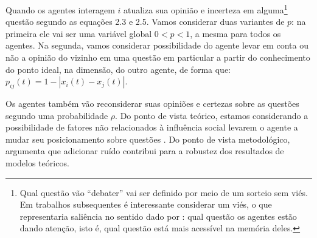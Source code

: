 Quando os agentes interagem \(i\) atualiza sua opinião e incerteza em
alguma\footnote{Qual questão vão ``debater'' vai ser definido por meio de um
  sorteio sem viés. Em trabalhos subsequentes é interessante considerar um viés,
  o que representaria saliência no sentido dado por
  : qual questão os agentes estão dando atenção,
  isto é, qual questão está mais acessível na memória deles.} questão segundo as
equações 2.3 e 2.5. Vamos considerar duas variantes de \(p\): na primeira ele
vai ser uma variável global \(0 < p < 1 \), a mesma para todos os agentes. Na
segunda, vamos considerar possibilidade do agente levar em conta ou não a
opinião do vizinho em uma questão em particular a partir do conhecimento do
ponto ideal, na dimensão, do outro agente, de forma que: \(p_{ij}(t) = 1 -
|x_i(t) - x_j(t)|\).

Os agentes também vão reconsiderar suas opiniões e certezas sobre as questões
segundo uma probabilidade \(\rho\). Do ponto de vista teórico, estamos considerando
a possibilidade de fatores não relacionados à influência social levarem o agente
a mudar seu posicionamento sobre questões \cite{flache2017, lorenz2017modeling}.
Do ponto de vista metodológico,  argumenta que
adicionar ruído contribui para a robustez dos resultados de modelos teóricos. 

